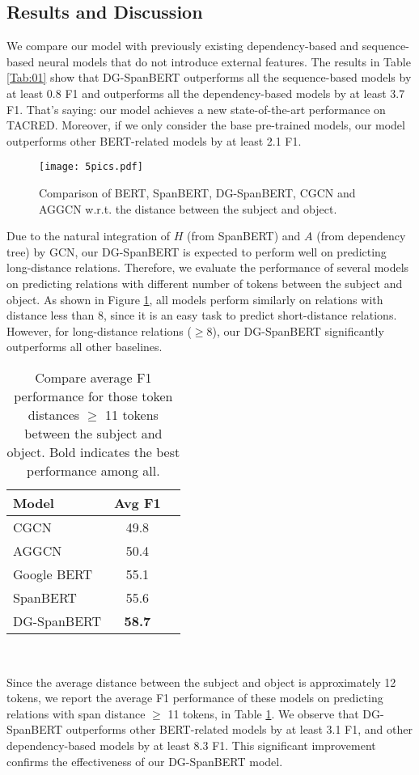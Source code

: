 \documentclass{article}
\begin{document}
\subsection{Results and Discussion}
We compare our model with previously existing dependency-based and sequence-based neural models that do not introduce external features. The results in Table \ref{Tab:01} show that   DG-SpanBERT  outperforms all the sequence-based models by at least 0.8 F1 and outperforms all the dependency-based models by at least 3.7 F1. That's saying: our model achieves a new state-of-the-art performance on  TACRED. Moreover, if we only consider the base pre-trained models, our model outperforms other BERT-related models by at least 2.1 F1. 

\begin{figure}[ht]

\centering
    \texttt{[image: 5pics.pdf]}
\caption{Comparison of BERT, SpanBERT, DG-SpanBERT, CGCN and AGGCN w.r.t. the distance between the subject and object.}
\label{fig:figure2}
\end{figure}
Due to the natural integration of $H$ (from SpanBERT) and $A$ (from dependency tree) by GCN, our DG-SpanBERT is expected to perform well on predicting long-distance relations. Therefore, we evaluate the performance of several models on predicting relations with different number of tokens between the subject and object. As shown in Figure \ref{fig:figure2}, all models perform similarly on relations with distance less than 8, since it is an easy task to predict short-distance relations. However, for long-distance relations ($\ge$8), our DG-SpanBERT significantly outperforms all other baselines.


		 

\begin{table}[ht]
	\centering
\begin{tabular}{lcc}
	\hline
     \textbf{Model} &  \textbf{Avg F1}   \\
	\hline
	CGCN & 49.8\\
	AGGCN & 50.4\\
	Google BERT & 55.1  \\
	SpanBERT & 55.6  \\
	DG-SpanBERT & \textbf{58.7} \\
	\hline

  \end{tabular}\\
\caption{Compare average F1 performance for those token distances $\geq$ 11 tokens between the subject and object. Bold indicates the best performance among all.}
\label{Tab:02}
	 \end{table}
Since the average distance between the subject and object is approximately 12 tokens, we report the average F1 performance of these models on predicting relations   with span distance $\geq$ 11 tokens,  in  Table \ref{Tab:02}. We observe that DG-SpanBERT outperforms other BERT-related models by at least 3.1 F1, and  other dependency-based models by at least 8.3 F1.  This significant improvement confirms the effectiveness of our DG-SpanBERT model.   
\end{document}
